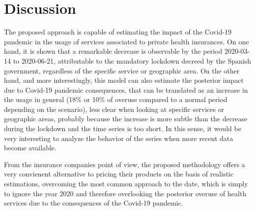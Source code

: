 \documentclass[12pt]{article}
\theoremstyle{definition}
\theoremstyle{remark}
\begin{document}
\section{Discussion}\label{discussion}
The proposed approach is capable of estimating the impact of the Covid-19 pandemic in the usage of services associated to private health insurances. On one hand, it is shown that a remarkable decrease is observable by the period 2020-03-14 to 2020-06-21, attributable to the mandatory lockdown decreed by the Spanish government, regardless of the specific service or geographic area. On the other hand, and more interestingly, this model can also estimate the posterior impact due to Covid-19 pandemic consequences, that can be translated as an increase in the usage in general (18\% or 10\% of overuse compared to a normal period depending on the scenario), less clear when looking at specific services or geographic areas, probably because the increase is more subtle than the decrease during the lockdown and the time series is too short. In this sense, it would be very interesting to analyze the behavior of the series when more recent data become available.

From the insurance companies point of view, the proposed methodology offers a very convienent alternative to pricing their products on the basis of realistic estimations, overcoming the most common approach to the date, which is simply to ignore the year 2020 and therefore overlooking the posterior overuse of health services due to the consequences of the Covid-19 pandemic.



\end{document}
